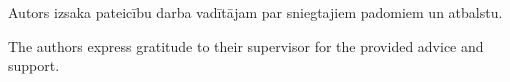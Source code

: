 \frontmatterpage
{}
Autors izsaka pateicību darba vadītājam par sniegtajiem padomiem un atbalstu.

The authors express gratitude to their supervisor for the provided advice and support.